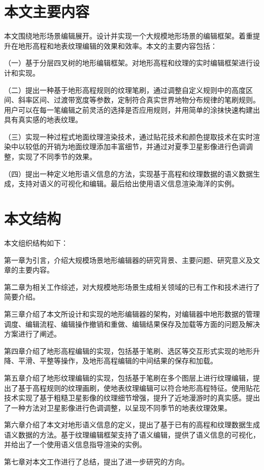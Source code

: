 \section{本文主要内容}
本文围绕地形场景编辑展开。设计并实现一个大规模地形场景的编辑框架。着重提升在地形高程和地表纹理编辑的效果和效率。本文的主要内容包括：\par
（一）基于分层四叉树的地形编辑框架。对地形高程和纹理的实时编辑框架进行设计和实现。\par
（二）提出一种基于地形高程规则的纹理笔刷，通过调整自定义规则中的高度区间、斜率区间、过渡带宽度等参数，定制符合真实世界地物分布规律的笔刷规则。用户可以在每一笔编辑之前灵活的选择是否应用规则，并用简单的涂抹快速构建出具有真实感的地表纹理。\par
（三）实现一种过程式地面纹理渲染技术，通过贴花技术和颜色提取技术在实时渲染中以较低的开销为地面纹理添加丰富细节，并通过对夏季卫星影像进行色调调整，实现了不同季节的效果。\par
（四）提出一种定义地形语义信息的方法，实现基于高程和纹理数据的语义数据生成，支持对语义的可视化和编辑。最后给出使用语义信息渲染海洋的实例。\par
\section{本文结构}
本文组织结构如下：\par
第一章为引言，介绍大规模场景地形编辑器的研究背景、主要问题、研究意义及文章的主要内容。\par
第二章为相关工作综述，对大规模地形场景生成相关领域的已有工作和技术进行了简要介绍。\par
第三章介绍了本文所设计和实现的地形编辑器的架构，对编辑器中地形数据的管理调度、编辑流程、编辑操作撤销和重做、编辑结果保存及加载等方面的问题及解决方案进行了阐述。\par
第四章介绍了地形高程编辑的实现，包括基于笔刷、选区等交互形式实现的地形升降、平滑、平整等操作，及地形高程编辑的中间结果的保存和加载。\par
第五章介绍了地形纹理编辑的实现，包括基于笔刷在多个图层上进行纹理编辑，提出了基于高程规则的纹理画刷，使地表纹理编辑可以符合地形高程特征。使用贴花技术实现了基于粗糙卫星影像的纹理细节增强，提升了近地漫游时的真实感。提出了一种方法对卫星影像进行色调调整，以呈现不同季节的地表纹理效果。\par
第六章介绍了本文对地形语义信息的定义，提出了基于已有的高程和纹理数据生成语义数据的方法。基于纹理编辑框架支持了语义编辑，提供了语义信息的可视化，并给出了一个使用语义信息指导渲染的实例。\par
第七章对本文工作进行了总结，提出了进一步研究的方向。


